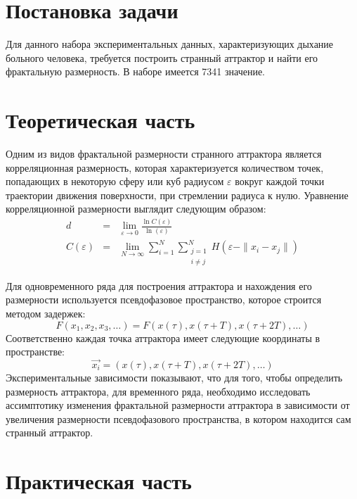 \documentclass[12pt, oneside, a4paper]{article}
\begin{document}

\frenchspacing
\tableofcontents
\newpage
\section{Постановка задачи}
Для данного набора экспериментальных данных, характеризующих дыхание больного
человека, требуется построить странный аттрактор и найти его фрактальную
размерность. В наборе имеется 7341 значение.
\section{Теоретическая часть}
Одним из видов фрактальной размерности странного аттрактора является корреляционная размерность, которая характеризуется количеством
точек, попадающих в некоторую сферу или куб радиусом $\varepsilon$ вокруг каждой точки траектории движения поверхности, при стремлении радиуса к нулю.
Уравнение корреляционной размерности выглядит следующим образом:
\begin{eqnarray}
    d &=& \lim_{\varepsilon \rightarrow 0}
    \frac{\ln C(\varepsilon)}{\ln(\varepsilon)}\\
    C(\varepsilon) &=& \lim_{N \rightarrow \infty} \sum_{i = 1}^N 
    \sum_{\substack{j = 1 \\ i \neq j}}^N
    H(\varepsilon - \|x_i - x_j\|)
\end{eqnarray}

Для одновременного ряда для построения аттрактора и нахождения его размерности
используется псевдофазовое пространство, которое строится методом задержек:
\begin{equation}
    F(x_1, x_2, x_3,\dots) = F(x(\tau), x(\tau + T), x(\tau + 2T),\dots)
\end{equation}
Соответственно каждая точка аттрактора имеет 
следующие координаты в пространстве:
\begin{equation}
    \vec{x_i} = (x(\tau), x(\tau + T), x(\tau + 2T), \dots)
\end{equation}
Экспериментальные зависимости показывают, что для того, чтобы определить 
размерность аттрактора, для временного ряда, необходимо исследовать ассимптотику изменения фрактальной размерности аттрактора в зависимости от увеличения размерности псевдофазового пространства, в котором находится сам странный аттрактор.
\newpage
\section{Практическая часть}
\end{document}
